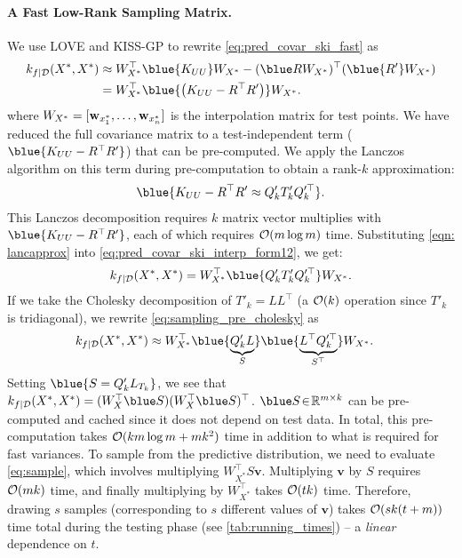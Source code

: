 \paragraph{A Fast Low-Rank Sampling Matrix.} We use LOVE{} and KISS-GP to rewrite \eqref{eq:pred_covar_ski_fast} as
%
\begin{align}
  k_{f \mid \dset} (\bX^*, \bX^*)
  &\approx \bW^\top_{X^*} \blue{K_{UU}} W_{X^*} - (\blue \bR \bW_{X^*})^\top (\blue{\bR'} \bW_{\bXtest})
    \notag \\
    &= \bW^\top_{\bX^*} \blue{\left( \bK_{UU} - \bR^\top \bR' \right)} \bW_{X^*}.
    \label{eq:pred_covar_ski_interp_form12}
\end{align}
%
where $W_{X^*} = [\mathbf{w}_{x^*_1}, \ldots, \mathbf{w}_{x^*_n}]$ is the interpolation matrix for test points.
We have reduced the full covariance matrix to a test-independent term ($\blue{ K_{UU} - R^\top R' }$) that can be pre-computed.
We apply the Lanczos algorithm on this term during pre-computation to obtain a rank-$k$ approximation:
%
\begin{align}
  \blue{K_{UU} - R^\top R' \approx Q'_k T'_k Q_k^{\prime\top} }.
  \label{eqn: lancapprox}
\end{align}
%
This Lanczos decomposition requires $k$ matrix vector multiplies with $\blue{ K_{UU} - R^{\top}R' }$, each of which requires $\bigo{m \log m}$ time.
Substituting \eqref{eqn: lancapprox} into \eqref{eq:pred_covar_ski_interp_form12}, we get:
%
\begin{align}
  k_{f \mid \dset} (\bX^*, \bX^*) = W^\top_{X^*} \blue{Q'_{k}T'_{k}Q_{k}^{\prime\top}} W_{X^*}.
  \label{eq:sampling_pre_cholesky}
\end{align}
If we take the Cholesky decomposition of $T'_k = \!L L^\top$ (a $\bigo{k}$ operation since $T'_{k}$ is tridiagonal), we rewrite \eqref{eq:sampling_pre_cholesky} as
%
\begin{align}
  k_{f \mid \dset} (\bX^*, \bX^*)
  &\approx  W^\top_{X^*} \blue{\underbrace{Q'_k L}_{S}} \blue{\underbrace{L^\top Q_k^{\prime\top}}_{S^\top}} W_{X^*}.
    \label{eq:pred_covar_ski_interp_form}
\end{align}
%
Setting $\blue{ S= Q'_k L_{T_k} }$, we see that $k_{f \mid \dset} (\bX^*, \bX^*) = (W_X^\top \blue S)(W_X^\top \blue S)^{\top}$.
$\blue S \! \in \! \reals^{m \times k}$ can be pre-computed and cached since it does not depend on test data.
In total, this pre-computation takes $\bigo{k m \log m + m k^2}$ time in addition to what is required for fast variances.
To sample from the predictive distribution, we need to evaluate \eqref{eq:sample}, which involves multiplying $W^\top_{X^*} S \mathbf{v}$.
Multiplying $\mathbf{v}$ by $S$ requires $\bigo{mk}$ time, and finally multiplying by $W^{\top}_{X^{*}}$ takes $\bigo{tk}$ time.
Therefore, drawing $s$ samples (corresponding to $s$ different values of $\mathbf{v}$) takes $\bigo{sk(t + m)}$ time total during the testing phase (see \autoref{tab:running_times}) -- a \emph{linear} dependence on $t$.


